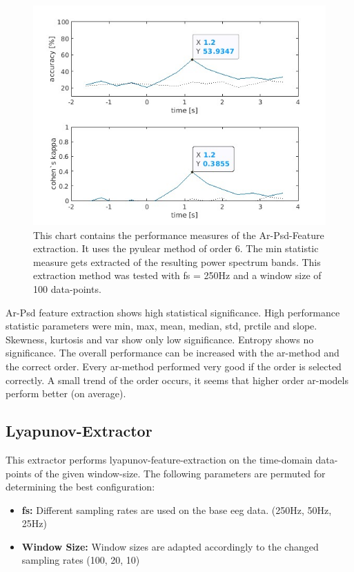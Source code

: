 \documentclass{article}
\begin{document}
\begin{figure}[H]
    \centering
    \includegraphics[width=\textwidth]{images/53.93-250hz-100-arPsd-pyulear-6-statistic-min.jpg}
    \caption{This chart contains the performance measures of the Ar-Psd-Feature extraction. It uses the pyulear method of order 6. The min statistic measure gets extracted of the resulting power spectrum bands. This extraction method was tested with fs = 250Hz and a window size of 100 data-points.}
\end{figure}

Ar-Psd feature extraction shows high statistical significance. High performance statistic parameters were min, max, mean, median, std, prctile and slope. Skewness, kurtosis and var show only low significance. Entropy shows no significance. The overall performance can be increased with the ar-method and the correct order. Every ar-method performed very good if the order is selected correctly. A small trend of the order occurs, it seems that higher order ar-models perform better (on average).

\subsection{Lyapunov-Extractor}
This extractor performs lyapunov-feature-extraction on the time-domain data-points of the given window-size. The following parameters are permuted for determining the best configuration:
\begin{itemize}
    \item \textbf{fs:} Different sampling rates are used on the base eeg data. (250Hz, 50Hz, 25Hz)
    \item \textbf{Window Size:} Window sizes are adapted accordingly to the changed sampling rates (100, 20, 10)
\end{itemize}
\end{document}

